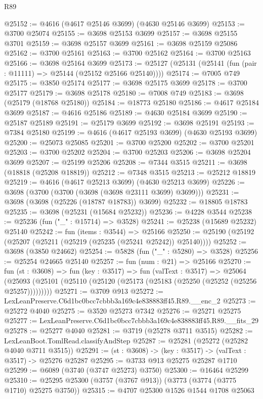 \begin{lexlean}{R89}
\begin{coremodule}
@25152 := @4616 (@4617 @25146 @3699) (@4630 @25146 @3699)
@25153 := @3700 @25074
@25155 := @3698 @25153 @3699
@25157 := @3698 @25155 @3701
@25159 := @3698 @25157 @3699
@25161 := @3698 @25159 @25086
@25162 := @3700 @25161
@25163 := @3700 @25162
@25164 := @3700 @25163
@25166 := @3698 @25164 @3699
@25173 := @25127 (@25131 (@25141 (fun (pair : @11111) => @25144 (@25152 @25166 @25140))))
@25174 := @7005 @749
@25175 := @3850 @25174
@25177 := @3698 @25175 @3699
@25178 := @3700 @25177
@25179 := @3698 @25178
@25180 := @7008 @749
@25183 := @3698 (@25179 (@18768 @25180))
@25184 := @18773 @25180
@25186 := @4617 @25184 @3699
@25187 := @4616 @25186
@25189 := @4630 @25184 @3699
@25190 := @25187 @25189
@25191 := @25179 @3699
@25192 := @3698 @25191
@25193 := @7384 @25180
@25199 := @4616 (@4617 @25193 @3699) (@4630 @25193 @3699)
@25200 := @25073 @25085
@25201 := @3700 @25200
@25202 := @3700 @25201
@25203 := @3700 @25202
@25204 := @3700 @25203
@25206 := @3698 @25204 @3699
@25207 := @25199 @25206
@25208 := @7344 @3515
@25211 := @3698 (@18818 (@25208 @18819))
@25212 := @7348 @3515
@25213 := @25212 @18819
@25219 := @4616 (@4617 @25213 @3699) (@4630 @25213 @3699)
@25226 := @3698 (@3700 (@3700 (@3698 (@3698 @23111 @3699) @3699)))
@25231 := @3698 (@3698 (@25226 (@18787 @18783)) @3699)
@25232 := @18805 @18783
@25235 := @3698 (@25231 (@15684 @25232))
@25236 := @4228 @3544
@25238 := @25236 (fun ("_" : @15714) => @3528)
@25241 := @25238 (@15689 @25232) @25140
@25242 := fun (items : @3544) => @25166
@25250 := @25190 (@25192 (@25207 (@25211 (@25219 (@25235 (@25241 @25242)) @25140))))
@25252 := @3698 (@3850 @24662)
@25254 := @5828 (fun ("_" : @5280) => @3528)
@25256 := @25254 @24665 @25140
@25257 := fun (num : @21) => @25166
@25270 := fun (st : @3608) =>
  fun (key : @3517) =>
  fun (valText : @3517) =>
  @25064 (@25093 (@25101 (@25110 (@25120 (@25173 (@25183 (@25250 (@25252 (@25256 @25257)))))))))
@25271 := @3709 @913
@25272 := LexLeanPreserve.C6d1bc0bcc7cbbb3a169c4e838883ff45.R89.__enc_2
@25273 := @25272 @4040
@25275 := @3520 @25273 @7342
@25276 := @25271 @25275
@25277 := LexLeanPreserve.C6d1bc0bcc7cbbb3a169c4e838883ff45.R89.__fits_29
@25278 := @25277 @4040
@25281 := @3719 (@25278 @3711 @3515)
@25282 := LexLeanBoot.TomlRead.classifyAndStep
@25287 := @25281 (@25272 (@25282 @4040 @3711 @3515))
@25291 := (st : @3608) -> (key : @3517) -> (valText : @3517) -> @25276 @25287
@25295 := @3733 @913 @25275 @25287 @1710
@25299 := @6089 (@3740 (@3747 @25273) @3750)
@25300 := @16464 @25299
@25310 := @25295 @25300 (@3757 (@3767 @913)) (@3773 (@3774 (@3775 @1710) @25275 @3750))
@25315 := @4707 @25300 @1526 @1544 @1708 @25063

\end{coremodule}
\end{lexlean}

